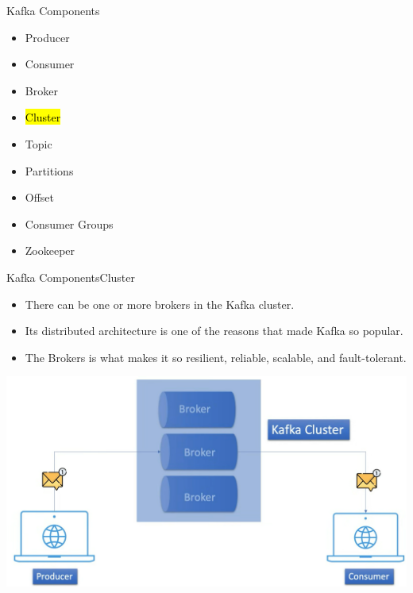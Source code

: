 \documentclass{beamer}
\begin{document}
\begin{frame}{Kafka Components}
  \begin{itemize}
    \item Producer
    \item Consumer
    \item Broker
    \item \hl{Cluster}
    \item Topic
    \item Partitions
    \item Offset
    \item Consumer Groups
    \item Zookeeper
  \end{itemize}
\end{frame}

\begin{frame}{Kafka Components}{Cluster}
  \begin{itemize}
    \item There can be one or more brokers in the Kafka cluster.
    \item Its distributed architecture is one of the reasons that made Kafka so popular.
    \item The Brokers is what makes it so resilient, reliable, scalable, and fault-tolerant.
  \end{itemize}
  \vspace*{0.1em}
  \includegraphics[scale=0.15]{fig/cluster.png}
\end{frame}
\end{document}
